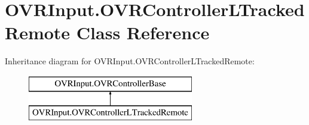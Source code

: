 \hypertarget{class_o_v_r_input_1_1_o_v_r_controller_l_tracked_remote}{}\section{O\+V\+R\+Input.\+O\+V\+R\+Controller\+L\+Tracked\+Remote Class Reference}
\label{class_o_v_r_input_1_1_o_v_r_controller_l_tracked_remote}
Inheritance diagram for O\+V\+R\+Input.\+O\+V\+R\+Controller\+L\+Tracked\+Remote\+:\begin{figure}[H]
\begin{center}
\leavevmode
\includegraphics[height=2.000000cm]{class_o_v_r_input_1_1_o_v_r_controller_l_tracked_remote}
\end{center}
\end{figure}
